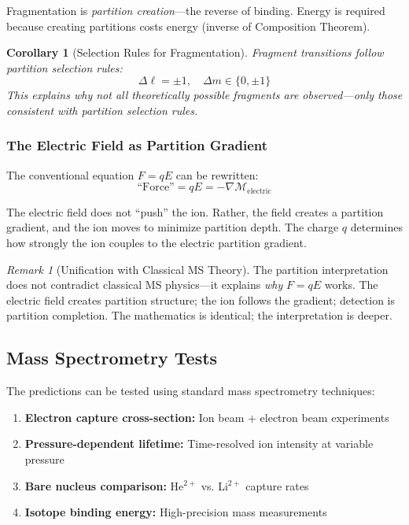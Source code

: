 \documentclass[twocolumn,10pt,a4paper]{article}
\newtheorem{corollary}[theorem]{Corollary}
\theoremstyle{definition}
\theoremstyle{remark}
\newtheorem{remark}[theorem]{Remark}
\newcommand{\Depth}{\mathcal{M}}
\begin{document}
Fragmentation is \emph{partition creation}---the reverse of binding. Energy is required because creating partitions costs energy (inverse of Composition Theorem).

\begin{corollary}[Selection Rules for Fragmentation]
Fragment transitions follow partition selection rules:
\begin{equation}
    \Delta \ell = \pm 1, \quad \Delta m \in \{0, \pm 1\}
\end{equation}
This explains why not all theoretically possible fragments are observed---only those consistent with partition selection rules.
\end{corollary}

\subsubsection{The Electric Field as Partition Gradient}

The conventional equation $F = qE$ can be rewritten:
\begin{equation}
    \text{``Force''} = q E = -\nabla \Depth_{\text{electric}}
\end{equation}

The electric field does not ``push'' the ion. Rather, the field creates a partition gradient, and the ion moves to minimize partition depth. The charge $q$ determines how strongly the ion couples to the electric partition gradient.

\begin{remark}[Unification with Classical MS Theory]
The partition interpretation does not contradict classical MS physics---it explains \emph{why} $F = qE$ works. The electric field creates partition structure; the ion follows the gradient; detection is partition completion. The mathematics is identical; the interpretation is deeper.
\end{remark}

\subsection{Mass Spectrometry Tests}

The predictions can be tested using standard mass spectrometry techniques:

\begin{enumerate}
    \item \textbf{Electron capture cross-section:} Ion beam + electron beam experiments
    \item \textbf{Pressure-dependent lifetime:} Time-resolved ion intensity at variable pressure
    \item \textbf{Bare nucleus comparison:} He$^{2+}$ vs. Li$^{2+}$ capture rates
    \item \textbf{Isotope binding energy:} High-precision mass measurements
\end{enumerate}
\end{document}
